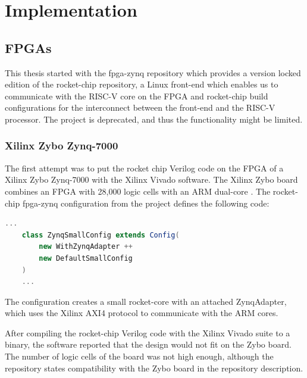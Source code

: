 \chapter{Implementation}\label{chap:implementation}
\section{FPGAs}
This thesis started with the fpga-zynq repository \cite{github_fpga_zynq}
which provides a version locked edition of the rocket-chip repository,
a Linux front-end which enables us to communicate with the RISC-V core on the FPGA
and rocket-chip build configurations for the interconnect between the front-end and
the RISC-V processor. The project is deprecated, and thus the functionality
might be limited.

\subsection{Xilinx Zybo Zynq-7000}
The first attempt was to put the rocket chip Verilog code on the FPGA of
a Xilinx Zybo Zynq-7000 with the Xilinx Vivado software.
The Xilinx Zybo board combines an FPGA with 28,000 logic cells with
an ARM dual-core \cite{xilinx_zybo}.
The rocket-chip fpga-zynq configuration from the project defines
the following code:
\begin{lstlisting}[language=scala, frame=single]
    ...
    class ZynqSmallConfig extends Config(
        new WithZynqAdapter ++
        new DefaultSmallConfig
    )
    ...
\end{lstlisting}
The configuration creates a small rocket-core with an attached
ZynqAdapter, which uses the Xilinx AXI4 protocol to communicate with
the ARM cores.

After compiling the rocket-chip Verilog code with the
Xilinx Vivado suite to a binary, the software reported that the
design would not fit on the Zybo board.
The number of logic cells of the board was not high enough, although
the repository states compatibility with the Zybo board in the
repository description.

